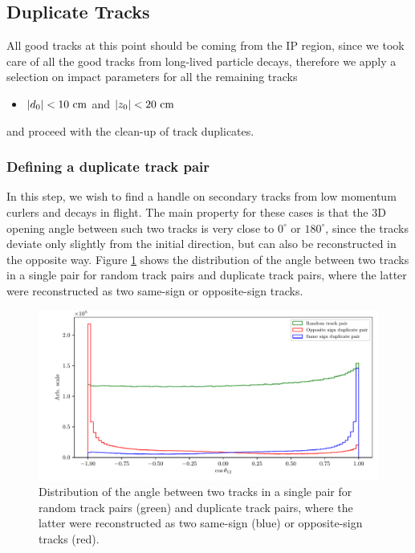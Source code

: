 \subsection{Duplicate Tracks}
All good tracks at this point should be coming from the IP region, since we took care of all the good tracks from long-lived particle decays, therefore we apply a selection on impact parameters for all the remaining tracks
\begin{itemize}
	\item $\vert d_0 \vert < 10\mathrm{~cm}$ and $\vert z_0 \vert < 20\mathrm{~cm}$
\end{itemize} 

and proceed with the clean-up of track duplicates.

\subsubsection{Defining a duplicate track pair}

In this step, we wish to find a handle on secondary tracks from low momentum curlers and decays in flight. The main property for these cases is that the 3D opening angle between such two tracks is very close to $0^\circ$ or $180^\circ$, since the tracks deviate only slightly from the initial direction, but can also be reconstructed in the opposite way. Figure \ref{fig:ROE_dupAngleInit} shows the distribution of the angle between two tracks in a single pair for random track pairs and duplicate track pairs, where the latter were reconstructed as two same-sign or opposite-sign tracks.

\begin{figure}[H]
	\centering
	\captionsetup{width=0.8\linewidth}
	\includegraphics[width=\linewidth]{fig/ROECleanup_dup_angle_initial}
	\caption{Distribution of the angle between two tracks in a single pair for random track pairs (green) and duplicate track pairs, where the latter were reconstructed as two same-sign (blue) or opposite-sign tracks (red).}
	\label{fig:ROE_dupAngleInit}
\end{figure}

